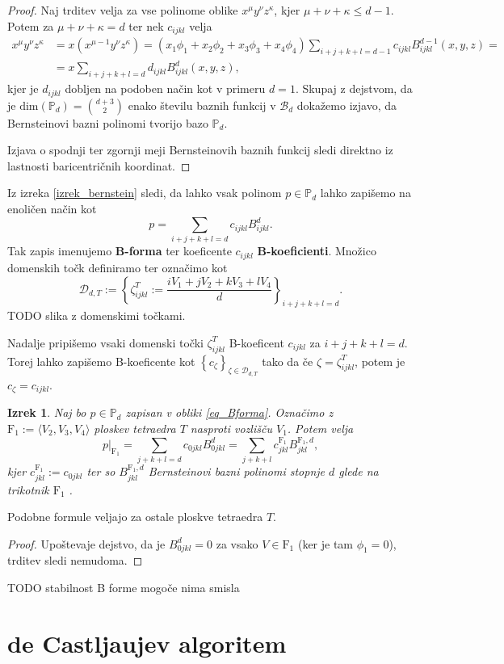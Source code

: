 \documentclass[11pt,a4paper]{article}
\newtheorem{theorem}{Izrek}
\begin{document}
\begin{proof}
    Naj trditev velja za vse polinome oblike $x^\mu y^\nu z^\kappa$, 
    kjer $\mu + \nu + \kappa \leq  d-1$. Potem za $\mu + \nu + \kappa =  d$ ter 
    nek $c_{ijkl}$ velja  
    \begin{align*}
        x^\mu y^\nu z^\kappa &= x \left(x^{\mu-1} y^\nu z^\kappa\right) = 
        \left(x_1 \phi_1 + x_2 \phi_2 + x_3 \phi_3 +x_4 \phi_4 \right) \sum_{i+j+k+l = d-1}c_{ijkl} B_{ijkl}^{d-1}(x,y,z) =
        \\ & =  x \sum_{i+j+k+l = d}d_{ijkl} B_{ijkl}^{d}(x,y,z)
        ,
    \end{align*}
    kjer je $d_{ijkl}$ dobljen na podoben način kot v primeru $d = 1$. Skupaj z dejstvom, 
    da je $\text{dim}\left(\mathbb{P}_d \right)=  \binom{d+3}{2}$ enako številu baznih funkcij 
    v $\mathcal{B}_d$ dokažemo izjavo, da Bernsteinovi bazni polinomi tvorijo 
    bazo $\mathbb{P}_d$. 

    Izjava o spodnji ter zgornji meji Bernsteinovih baznih funkcij sledi direktno iz
    lastnosti baricentričnih koordinat.
\end{proof}

Iz izreka \ref{izrek_bernstein} sledi, da lahko vsak polinom $p \in \mathbb{P}_d$
lahko zapišemo na enoličen način kot
\begin{equation}\label{eq_Bforma}
    p = \sum_{i+j+k+l = d} c_{ijkl} B_{ijkl}^d.
\end{equation}
Tak zapis imenujemo \textbf{B-forma} ter koeficente $c_{ijkl}$ \textbf{B-koeficienti}.
Množico domenskih točk definiramo ter označimo kot
\begin{equation}
    \mathcal{D}_{d,T} := 
    \left\{
        \zeta_{ijkl}^T:= \frac{i V_1 + j V_2 + k V_3 + l V_4}{d}
     \right\}_{i + j+ k+l = d}.
\end{equation}
TODO slika z domenskimi točkami.

Nadalje pripišemo vsaki domenski točki $\zeta_{ijkl}^T$ B-koeficent
$c_{ijkl}$ za $i +j+k+l = d$. Torej lahko zapišemo B-koeficente kot $\left\{
    c_{\zeta}
\right\}_{\zeta \in \mathcal{D}_{d,T}}$ tako da če $\zeta = \zeta_{ijkl}^T$,
potem je $c_{\zeta} = c_{ijkl}$.

\begin{theorem}
    Naj bo $p \in \mathbb{P}_d$ zapisan v obliki \eqref{eq_Bforma}. Označimo 
    z $\text{F}_1 := \langle V_2,V_3,V_4 \rangle$ ploskev tetraedra $T$ nasproti vozlišču $V_1$.
    Potem velja 
    \begin{equation}
        p|_{\text{F}_1} = \sum_{j+k+l = d} c_{0jkl}B_{0jkl}^d = 
            \sum_{j+k+l}c_{jkl}^{\text{F}_1} B_{jkl}^{\text{F}_1,d},
    \end{equation}
    kjer $c_{jkl}^{\text{F}_1}:=c_{0jkl}$ ter so $B_{jkl}^{\text{F}_1,d}$
    Bernsteinovi bazni polinomi stopnje $d$ glede na trikotnik $\text{F}_1$ .
\end{theorem}

Podobne formule veljajo za ostale ploskve tetraedra $T$.

\begin{proof}
    Upoštevaje dejstvo, da je $B_{0jkl}^d = 0$ za vsako $V \in \text{F}_1$ (ker je 
    tam $\phi_1 = 0$), trditev sledi nemudoma.
\end{proof}

TODO stabilnost B forme mogoče nima smisla

\section{de Castljaujev algoritem}
\end{document}

